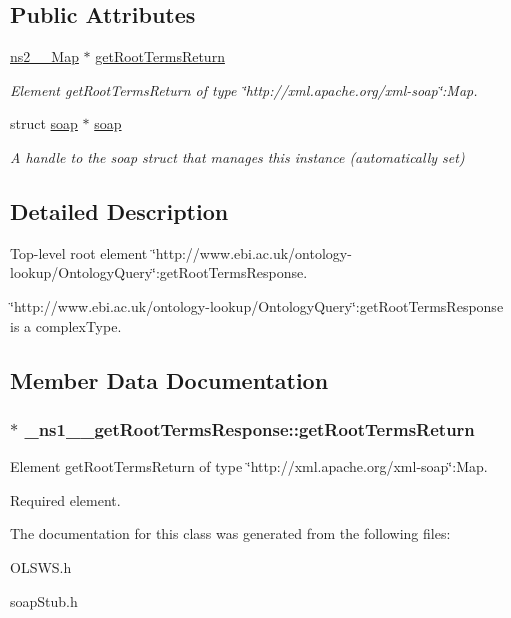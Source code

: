 \subsection*{Public Attributes}
\begin{DoxyCompactItemize}
\item 
\hyperlink{classns2____Map}{ns2\_\-\_\-Map} $\ast$ \hyperlink{class__ns1____getRootTermsResponse_a6d955286d012fc78c2da75512c18361d}{getRootTermsReturn}
\begin{DoxyCompactList}\small\item\em Element getRootTermsReturn of type \char`\"{}http://xml.apache.org/xml-\/soap\char`\"{}:Map. \end{DoxyCompactList}\item 
\hypertarget{class__ns1____getRootTermsResponse_a36db8ed72dfaedf29239baeebab951f5}{
struct \hyperlink{class__ns1____getRootTermsResponse_a36db8ed72dfaedf29239baeebab951f5}{soap} $\ast$ \hyperlink{class__ns1____getRootTermsResponse_a36db8ed72dfaedf29239baeebab951f5}{soap}}
\label{class__ns1____getRootTermsResponse_a36db8ed72dfaedf29239baeebab951f5}

\begin{DoxyCompactList}\small\item\em A handle to the soap struct that manages this instance (automatically set) \end{DoxyCompactList}\end{DoxyCompactItemize}


\subsection{Detailed Description}
Top-\/level root element \char`\"{}http://www.ebi.ac.uk/ontology-\/lookup/OntologyQuery\char`\"{}:getRootTermsResponse. 

\char`\"{}http://www.ebi.ac.uk/ontology-\/lookup/OntologyQuery\char`\"{}:getRootTermsResponse is a complexType. 

\subsection{Member Data Documentation}
\hypertarget{class__ns1____getRootTermsResponse_a6d955286d012fc78c2da75512c18361d}{
\subsubsection[{getRootTermsReturn}]{ $\ast$ {\bf \_\-ns1\_\-\_\-getRootTermsResponse::getRootTermsReturn}}}
\label{class__ns1____getRootTermsResponse_a6d955286d012fc78c2da75512c18361d}


Element getRootTermsReturn of type \char`\"{}http://xml.apache.org/xml-\/soap\char`\"{}:Map. 

Required element. 

The documentation for this class was generated from the following files:\begin{DoxyCompactItemize}
\item 
OLSWS.h\item 
soapStub.h\end{DoxyCompactItemize}
